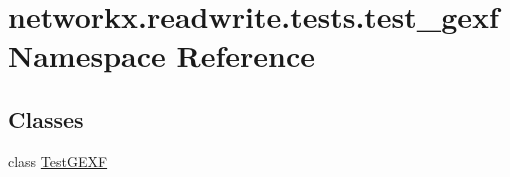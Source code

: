 \hypertarget{namespacenetworkx_1_1readwrite_1_1tests_1_1test__gexf}{}\section{networkx.\+readwrite.\+tests.\+test\+\_\+gexf Namespace Reference}
\label{namespacenetworkx_1_1readwrite_1_1tests_1_1test__gexf}
\subsection*{Classes}
\begin{DoxyCompactItemize}
\item 
class \hyperlink{classnetworkx_1_1readwrite_1_1tests_1_1test__gexf_1_1TestGEXF}{Test\+G\+E\+XF}
\end{DoxyCompactItemize}
